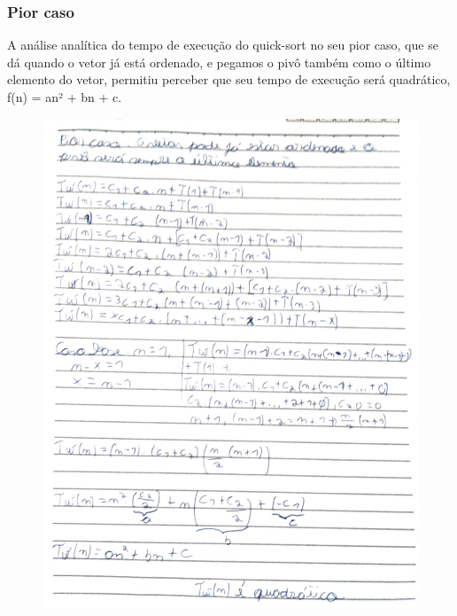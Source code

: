 \newpage

\subsubsection{Pior caso}
A análise analítica do tempo de execução do quick-sort no seu pior caso, que se dá quando o vetor já está ordenado, e pegamos o pivô também como o último elemento do vetor, permitiu perceber que seu tempo de execução será quadrático,  f(n) = an² +
bn + c.
\begin{figure}[h]
    \centering
    \includegraphics[width=0.76\linewidth]{Imagens/pior-quick.jpg}
\end{figure}